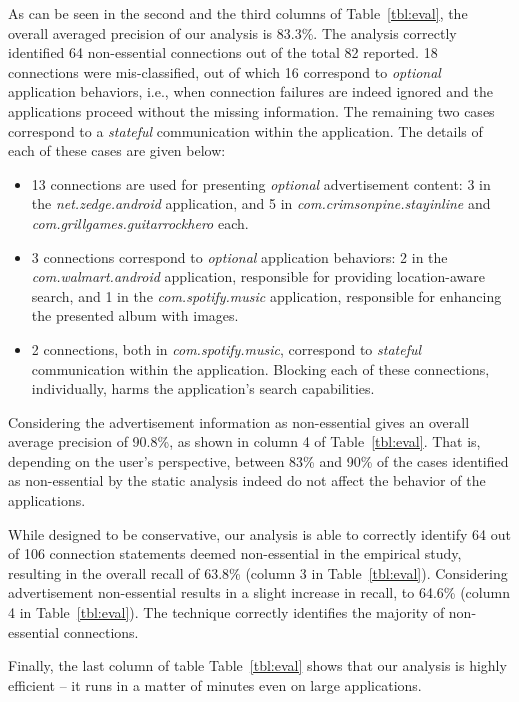 As can be seen in the second and the third columns of Table~\ref{tbl:eval}, the overall averaged precision of our analysis is 83.3\%. 
The analysis correctly identified 64 non-essential connections out of the total 82 reported. 
18 connections were mis-classified, out of which 16 correspond to \emph{optional} application behaviors, i.e.,
when connection failures are indeed ignored and the applications proceed without the missing information. The 
remaining two cases correspond to a \emph{stateful} communication within the application. 
The details of each of these cases are given below: 

\begin{itemize}\setlength{\itemsep}{-0.05in}
\item 13 connections are used for presenting \emph{optional} advertisement content: 
3 in the \emph{net.zedge.android} application, and 
5 in \emph{com.crimsonpine.stayinline} and \emph{com.grillgames.guitarrockhero} each.
\item 3 connections correspond to 
\emph{optional} application behaviors: 2 in the \emph{com.walmart.android} application, responsible for providing location-aware search, and 1 in the \emph{com.spotify.music} application, responsible for enhancing the presented album with images.
\item 2 connections, both in \emph{com.spotify.music}, correspond to \emph{stateful} communication within the application. 
Blocking each of these connections, individually, harms the application's search capabilities.
\end{itemize}

Considering the advertisement information as non-essential gives an overall average precision of 90.8\%, as shown in column 4 of Table~\ref{tbl:eval}. 
That is, depending on the user's perspective, 
between 83\% and 90\% of the cases identified as non-essential by the static analysis indeed do not affect the behavior of the applications. 

While designed to be conservative, our analysis is able to correctly identify 64 out of 106 connection statements deemed non-essential in the empirical study, resulting in the overall recall of 63.8\% (column 3 in Table~\ref{tbl:eval}). Considering advertisement non-essential results in a slight increase in recall, to 64.6\% (column 4 in Table~\ref{tbl:eval}).
The technique correctly identifies the majority of non-essential connections.

Finally, the last column of table Table~\ref{tbl:eval} shows that our analysis is highly efficient -- it runs in a matter of minutes even on large applications. 

